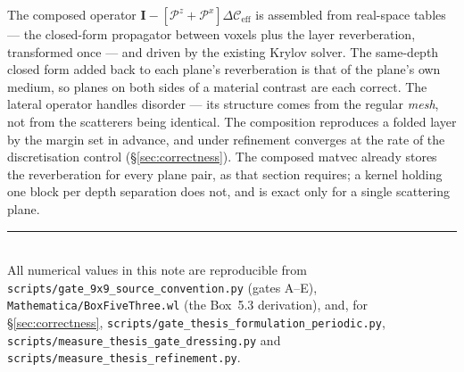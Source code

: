 \documentclass[11pt,a4paper]{article}
\newcommand{\bI}{\mathbf{I}}
\newcommand{\Pz}{\mathcal{P}^{z}}
\newcommand{\Px}{\mathcal{P}^{x}}
\newcommand{\dC}{\Delta\mathcal{C}_{\mathrm{eff}}}
\begin{document}
The composed operator $\bI - [\Pz + \Px]\dC$ is assembled from real-space tables ---
the closed-form propagator between voxels plus the layer reverberation, transformed
once --- and driven by the existing Krylov solver. The same-depth closed form added
back to each plane's reverberation is that of the plane's own medium, so planes on
both sides of a material contrast are each correct. The lateral operator handles
disorder --- its structure comes from the regular \emph{mesh}, not from the
scatterers being identical. The composition reproduces a folded layer by the margin set in
advance, and under refinement converges at the rate of the discretisation control
(\S\ref{sec:correctness}). The composed matvec already stores the reverberation for every plane
pair, as that section requires; a kernel holding one block per depth separation does not, and is
exact only for a single scattering plane.

\vfill
\noindent\rule{\linewidth}{0.4pt}\\
{\footnotesize All numerical values in this note are reproducible from
\texttt{scripts/gate\_9x9\_source\_convention.py} (gates A--E),
\texttt{Mathematica/BoxFiveThree.wl} (the Box~5.3 derivation), and, for
\S\ref{sec:correctness}, \texttt{scripts/gate\_thesis\_formulation\_periodic.py},
\texttt{scripts/measure\_thesis\_gate\_dressing.py} and
\texttt{scripts/measure\_thesis\_refinement.py}.}
\end{document}
